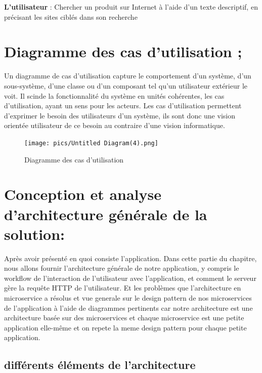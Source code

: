\textbf{L'utilisateur} : Chercher un produit sur Internet à l'aide d'un texte descriptif, en précisant les sites ciblés dans son recherche 

\section{Diagramme des cas d’utilisation ;}

Un diagramme de cas d'utilisation capture le comportement d'un système, d'un sous-système, d'une classe ou d'un composant tel qu'un utilisateur extérieur le voit. Il scinde la fonctionnalité du système en unités cohérentes, les cas d'utilisation, ayant un sens pour les acteurs. Les cas d'utilisation permettent d'exprimer le besoin des utilisateurs d'un système, ils sont donc une vision orientée utilisateur de ce besoin au contraire d'une vision informatique.

\begin{figure}[h]
    \centering
    \texttt{[image: pics/Untitled Diagram(4).png]}    
    \caption{Diagramme des cas d'utilisation}
\end{figure}

\vfill


\section{Conception et analyse d'architecture générale de la solution: }

Après avoir présenté en quoi consiste l'application. Dans cette partie du chapitre, nous allons fournir l'architecture générale de notre application, y compris le workflow de l'interaction de l'utilisateur avec l'application, et comment le serveur gère la requête HTTP de l'utilisateur. Et les problèmes que l'architecture en microservice a résolus et vue generale sur le design pattern de nos microservices de l'application à l'aide de diagrammes pertinents car notre architecture est une architecture basée sur des microservices et chaque microservice est une petite application elle-même et on repete la meme design pattern pour chaque petite application.


\newpage




\subsection{différents éléments de l'architecture }


